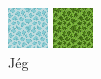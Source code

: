 \begin{figure}[!htb]
  \includegraphics[width=\linewidth]{images/ice2x2.png}
  \caption{Jég}\label{fig:block_image5}
\endminipage\hfill
{}
  \includegraphics[width=\linewidth]{images/swamp2x2.png}

\end{figure}
